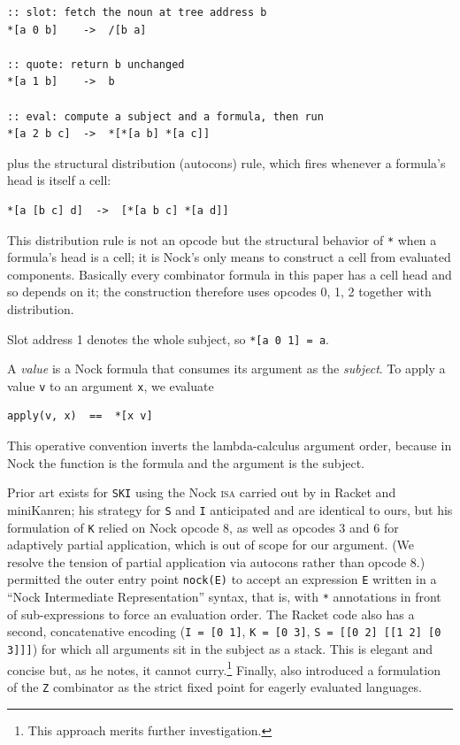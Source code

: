 \documentclass[twoside]{article}
\begin{document}
\begin{lstlisting}[style=listingblock]
:: slot: fetch the noun at tree address b
*[a 0 b]    ->  /[b a]

:: quote: return b unchanged
*[a 1 b]    ->  b

:: eval: compute a subject and a formula, then run
*[a 2 b c]  ->  *[*[a b] *[a c]]
\end{lstlisting}

\noindent
plus the structural distribution (autocons) rule, which fires whenever a formula's head is itself a cell:

\begin{lstlisting}[style=listingblock]
*[a [b c] d]  ->  [*[a b c] *[a d]]
\end{lstlisting}

\noindent
This distribution rule is not an opcode but the structural behavior of \texttt{*} when a formula's head is a cell; it is Nock's only means to construct a cell from evaluated components.  Basically every combinator formula in this paper has a cell head and so depends on it; the construction therefore uses opcodes 0, 1, 2 together with distribution.

Slot address 1 denotes the whole subject, so \lstinline[style=inlinecode]{*[a 0 1] = a}.

A \emph{value} is a Nock formula that consumes its
argument as the \emph{subject}. To apply a value \lstinline[style=inlinecode]{v} to an argument \lstinline[style=inlinecode]{x}, we evaluate

\begin{lstlisting}[style=listingblock]
apply(v, x)  ==  *[x v]
\end{lstlisting}

\noindent
This operative convention inverts the lambda-calculus argument order, because in Nock the function is the formula and the argument is the subject.

Prior art exists for \texttt{SKI} using the Nock \textsc{isa} carried out by \citet{Torre2024} in Racket and miniKanren; his strategy for \texttt{S} and \texttt{I} anticipated and are identical to ours, but his formulation of \texttt{K} relied on Nock opcode 8, as well as opcodes 3 and 6 for adaptively partial application, which is out of scope for our argument.  (We resolve the tension of partial application via autocons rather than opcode 8.)  \citeauthor{Torre2024} permitted the outer entry point \texttt{nock(E)} to accept an expression \texttt{E} written in a ``Nock Intermediate Representation'' syntax, that is, with \texttt{*} annotations in front of sub-expressions to force an evaluation order.  The Racket code also has a second, concatenative encoding (\texttt{I = [0 1]}, \texttt{K = [0 3]}, \texttt{S = [[0 2] [[1 2] [0 3]]]}) for which all arguments sit in the subject as a stack.  This is elegant and concise but, as he notes, it cannot curry.\footnote{This approach merits further investigation.}  Finally, \citeauthor{Torre2024} also introduced a formulation of the \texttt{Z} combinator as the strict fixed point for eagerly evaluated languages.
\end{document}
